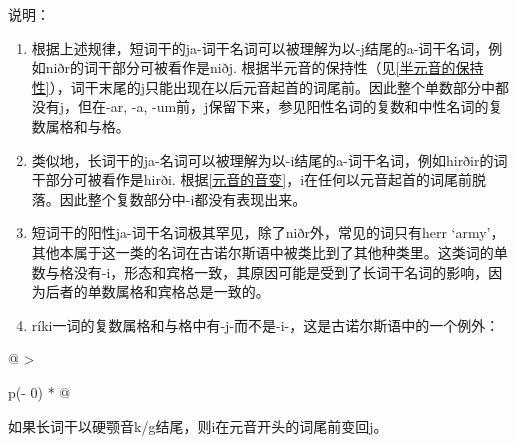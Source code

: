 说明：

\begin{enumerate}
  \def\labelenumi{\arabic{enumi})}
  \item
        根据上述规律，短词干的ja-词干名词可以被理解为以-j结尾的a-词干名词，例如niðr的词干部分可被看作是niðj.
        根据半元音的保持性（见\ref{半元音的保持性}），词干末尾的j只能出现在以后元音起首的词尾前。因此整个单数部分中都没有j，但在-ar,
        -a, -um前，j保留下来，参见阳性名词的复数和中性名词的复数属格和与格。
  \item
        类似地，长词干的ja-名词可以被理解为以-i结尾的a-词干名词，例如hirðir的词干部分可被看作是hirði.
        根据\ref{元音的音变}，i在任何以元音起首的词尾前脱落。因此整个复数部分中-i都没有表现出来。
  \item
        短词干的阳性ja-词干名词极其罕见，除了niðr外，常见的词只有herr
        `army'，其他本属于这一类的名词在古诺尔斯语中被类比到了其他种类里。这类词的单数与格没有-i，形态和宾格一致，其原因可能是受到了长词干名词的影响，因为后者的单数属格和宾格总是一致的。
  \item
        ríki一词的复数属格和与格中有-j-而不是-i-，这是古诺尔斯语中的一个例外：
\end{enumerate}

\begin{longtable}[]{@{}
  >{\raggedright\arraybackslash}p{(\columnwidth - 0\tabcolsep) * }@{}}
  \toprule\noalign{}
  \begin{minipage}[b]{\linewidth}\raggedright
    如果长词干以硬颚音k/g结尾，则i在元音开头的词尾前变回j。
  \end{minipage} \\
  \midrule\noalign{}
  \endhead
  \bottomrule\noalign{}
  \endlastfoot
\end{longtable}

